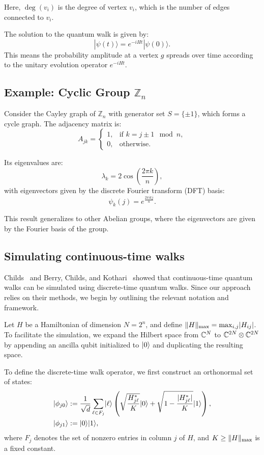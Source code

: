 \documentclass[11pt]{article}
\theoremstyle{definition}
\begin{document}
Here, \( \deg(v_i) \) is the degree of vertex \( v_i \), which is the number of edges connected to \( v_i \).


The solution to the quantum walk is given by:
\[
|\psi(t)\rangle = e^{-i H t} |\psi(0)\rangle.
\]
This means the probability amplitude at a vertex \( g \) spreads over time according to the unitary evolution operator \( e^{-i H t} \).


\subsection*{Example: Cyclic Group \( \mathbb{Z}_n \)}

Consider the Cayley graph of \( \mathbb{Z}_n \) with generator set \( S = \{\pm 1\} \), which forms a cycle graph. The adjacency matrix is:
\[
A_{jk} =
\begin{cases}
1, & \text{if } k = j \pm 1 \mod n, \\
0, & \text{otherwise}.
\end{cases}
\]

Its eigenvalues are:
\[
\lambda_k = 2\cos\left(\frac{2\pi k}{n}\right),
\]
with eigenvectors given by the discrete Fourier transform (DFT) basis:
\[
\psi_k(j) = e^{\frac{2\pi i k j}{n}}.
\]

This result generalizes to other Abelian groups, where the eigenvectors are given by the Fourier basis of the group.


\subsection{Simulating continuous-time walks}
Childs~\cite{childs2010relationship} and Berry, Childs, and Kothari~\cite{berry2015hamiltonian} showed that continuous-time quantum walks can be simulated using discrete-time quantum walks. Since our approach relies on their methods, we begin by outlining the relevant notation and framework.

Let \( H \) be a Hamiltonian of dimension \( N = 2^n \), and define \( \lVert H\rVert_{\mathrm{max}} = \max_{i, j} \lvert H_{ij}\rvert \). To facilitate the simulation, we expand the Hilbert space from \( \mathbb{C}^N \) to \( \mathbb{C}^{2N} \otimes \mathbb{C}^{2N} \) by appending an ancilla qubit initialized to \( \lvert0\rangle \) and duplicating the resulting space.

To define the discrete-time walk operator, we first construct an orthonormal set of states:
\begin{align}
    \lvert\phi_{j0}\rangle & := \frac{1}{\sqrt{d}} \sum_{\ell \in F_j} \lvert\ell\rangle \left( \sqrt{\frac{H_{j\ell}^*}{K}} \lvert0\rangle + \sqrt{1 - \frac{\lvert H_{j\ell}^*\rvert}{K}} \lvert1\rangle \right), \label{eq:walk-sim} \\
    \lvert\phi_{j1}\rangle & := \lvert0\rangle \lvert1\rangle, \nonumber
\end{align}
where \( F_j \) denotes the set of nonzero entries in column \( j \) of \( H \), and \( K \ge \lVert H\rVert_{\mathrm{max}} \) is a fixed constant.
\end{document}
